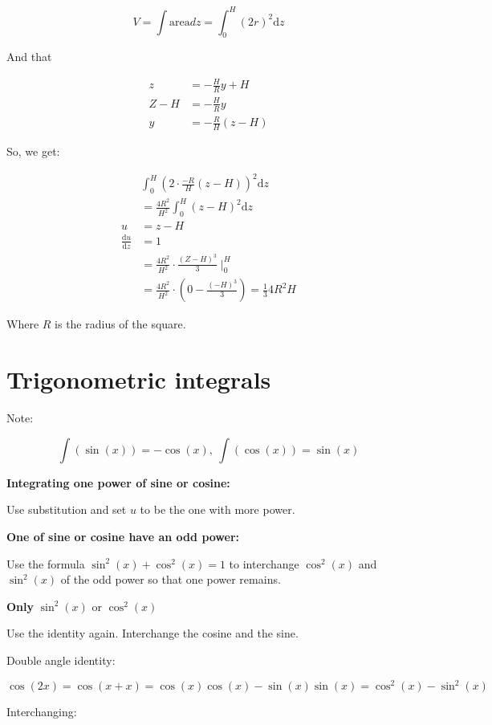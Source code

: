 \documentclass[12pt]{article}
\theoremstyle{plain}
\theoremstyle{remark}
\theoremstyle{definition}
\begin{document}
\[V = \int\text{area}dz = \int_{0}^{H}{(2r)^{2}\text{d}z}\]

And that


\begin{align*}
z &= - \frac{H}{R}y + H \\
Z - H &= - \frac{H}{R}y \\
y &= - \frac{R}{H}(z - H)
\end{align*}


So, we get:

\begin{align*}
&\int_{0}^{H}{\left( 2 \cdot \frac{- R}{H}(z - H) \right)^{2}\text{d}z} \\
&= \frac{4R^{2}}{H^{2}}\int_{0}^{H}{(z - H)^{2}\text{d}z} \\
u &= z - H \\
\frac{\text{d}u}{\text{d}z} &= 1 \\
&= \frac{4R^{2}}{H^{2}} \cdot \frac{(Z - H)^{3}}{3} \mid_{0}^{H} \\
&= \frac{4R^{2}}{H^{2}} \cdot \left( 0 - \frac{( - H)^{3}}{3} \right) = \frac{1}{3}4R^{2}H
\end{align*}


Where \(R\) is the radius of the square.



\section{Trigonometric integrals}

Note:

\[\int\left( \sin(x) \right) = - \cos(x),\ \int\left( \cos(x) \right) = \sin(x)\]

\textbf{Integrating one power of sine or cosine:}

Use substitution and set \(u\) to be the one with more power.

\textbf{One of sine or cosine have an odd power:}

Use the formula \(\sin^{2}(x) + \cos^{2}(x) = 1\) to interchange
\(\cos^{2}(x)\) and \(\sin^{2}(x)\) of the odd power so that one power
remains.

\textbf{Only} \(\sin^{2}(x)\) or \(\cos^{2}(x)\)

Use the identity again. Interchange the cosine and the sine.

Double angle identity:

\[\cos(2x) = \cos(x + x) = \cos(x)\cos(x) - \sin(x)\sin(x) = \cos^{2}(x) - \sin^{2}(x)\]

Interchanging:
\end{document}
